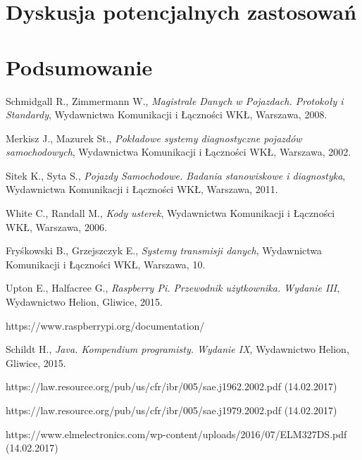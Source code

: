 \documentclass[12pt]{article} %
\numberwithin{equation}{subsection}
\numberwithin{figure}{section}
\numberwithin{table}{section}
\begin{document}
	\newpage
	
	\section{Dyskusja potencjalnych zastosowań}
	
	\newpage
	
	\section{Podsumowanie}
	
	\hspace{0.5cm} 
	
	\newpage	
	
\begin{thebibliography}{99}

		Schmidgall R., Zimmermann W., \emph{Magistrale Danych w Pojazdach. Protokoły i Standardy}, Wydawnictwa Komunikacji i Łączności WKŁ, Warszawa, 2008.

		Merkisz J., Mazurek St., \emph{Pokładowe systemy diagnostyczne pojazdów samochodowych}, Wydawnictwa Komunikacji i Łączności WKŁ, Warszawa, 2002.		
		
		Sitek K., Syta S., \emph{Pojazdy Samochodowe. Badania stanowiskowe i diagnostyka}, Wydawnictwa Komunikacji i Łączności WKŁ, Warszawa, 2011.
		
		White C., Randall M., \emph{Kody usterek}, Wydawnictwa Komunikacji i Łączności WKŁ, Warszawa, 2006.
		
		Fryśkowski B., Grzejszczyk E., \emph{Systemy transmisji danych}, Wydawnictwa Komunikacji i Łączności WKŁ, Warszawa, 10.
		
		Upton E., Halfacree G., \emph{Raspberry Pi. Przewodnik użytkownika. Wydanie III}, Wydawnictwo Helion, Gliwice, 2015.
		
		https://www.raspberrypi.org/documentation/
	
		Schildt H., \emph{Java. Kompendium programisty. Wydanie IX}, Wydawnictwo Helion, Gliwice, 2015.
		
		https://law.resource.org/pub/us/cfr/ibr/005/sae.j1962.2002.pdf (14.02.2017)
		
		https://law.resource.org/pub/us/cfr/ibr/005/sae.j1979.2002.pdf (14.02.2017)
		
		https://www.elmelectronics.com/wp-content/uploads/2016/07/ELM327DS.pdf (14.02.2017)
		

\end{thebibliography}
\end{document}
